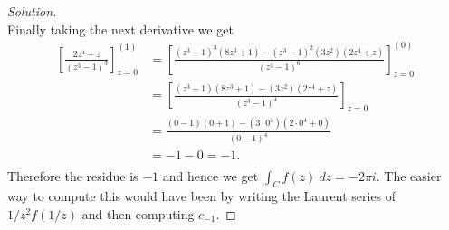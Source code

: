 \documentclass[11pt]{amsart}
\theoremstyle{definition}
\numberwithin{theorem}{section}
\numberwithin{definition}{section}
\numberwithin{equation}{section}
\newenvironment{solution}
  {\begin{proof}[Solution]}
  {\end{proof}}
\begin{document}
\begin{solution}
\begin{equation*}
	\end{equation*}
	Finally taking the next derivative we get
	\begin{equation*}
		\begin{aligned}
		\left[\frac{ 2z^4 +z}{(z^3 - 1)^3}\right]^{(1)}_{z=0} &=\left[\frac{ (z^3 - 1)^3(8z^3 +1) - (z^3 - 1)^2(3z^2)(2z^4+z)}{(z^3 - 1)^6}\right]^{(0)}_{z=0}\\	
		&=\left[\frac{ (z^3 - 1)(8z^3 +1) - (3z^2)(2z^4+z)}{(z^3 - 1)^4}\right]_{z=0}\\	
		&=\frac{ (0- 1)(0 +1) - (3\cdot 0^3)(2\cdot 0^4+ 0)}{(0 - 1)^4}\\	
		&={ -1 - 0} = -1.\\	
		\end{aligned}
	\end{equation*}
	Therefore the residue is $-1$ and hence we get $\int_C f(z)\ dz = -2\pi i.$ The easier way to compute this would have been by writing the Laurent series of $1/z^2f(1/z)$ and then computing $c_{-1}.$
\end{solution}
\end{document}
